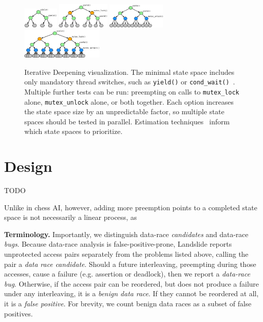 \begin{figure}[t]
	\includegraphics[width=0.15\textwidth]{tree0.pdf}
	\includegraphics[width=0.225\textwidth]{tree1.pdf}
	\includegraphics[width=0.25\textwidth]{tree2.pdf}
	\includegraphics[width=0.35\textwidth]{tree3.pdf}
	\caption{Iterative Deepening visualization.
		The minimal state space includes only mandatory thread switches, such as {\tt yield()} or {\tt cond\_wait()}~\cite{landslide}.
Multiple further tests can be run: preempting on calls to {\tt mutex\_lock} alone, {\tt mutex\_unlock} alone, or both together.
Each option increases the state space size by an unpredictable factor, so multiple state spaces should be tested in parallel.
Estimation techniques~\cite{estimation} inform which state spaces to prioritize.
}
	\label{fig:id}
\end{figure}
\section{Design}

TODO

Unlike in chess AI, however, adding more preemption points to a completed state space is not necessarily a linear process, as  %


{\bf Terminology.}
Importantly, we distinguish data-race {\em candidates} and data-race {\em bugs}.
Because data-race analysis is false-positive-prone, Landslide reports unprotected access pairs separately from the problems listed above, calling the pair a {\em data race candidate}.
Should a future interleaving, preempting during those accesses, cause a failure (e.g. assertion or deadlock), then we report a {\em data-race bug}.
Otherwise, if the access pair can be reordered, but does not produce a failure under any interleaving, it is a {\em benign data race}.
If they cannot be reordered at all, it is a {\em false positive}.
For brevity, we count benign data races as a subset of false positives.

